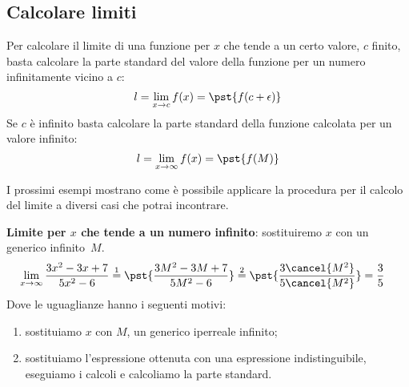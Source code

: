 \subsection{Calcolare limiti}
\label{subsec:cont_limiti_calcolo}

\begin{procedura}
Per calcolare il limite di una funzione per \(x\) che tende a un certo 
valore, \(c\) finito, basta calcolare la parte standard del valore della 
funzione per un numero infinitamente vicino a \(c\):
\[l=\lim_{x \rightarrow c} f(x) = \pst{f(c+\epsilon)}\]
Se \(c\) è infinito basta calcolare la parte standard della funzione 
calcolata per un valore infinito:
\[l=\lim_{x \rightarrow \infty} f(x) = \pst{f(M)}\]
\end{procedura}


I prossimi esempi mostrano come è possibile applicare la procedura per il 
calcolo del limite a diversi casi che potrai incontrare.

\begin{esempio}
\textbf{Limite per \(x\) che tende a un numero infinito}:
sostituiremo \(x\) con un generico infinito~\(M\).
\begin{align*}
\lim_{x \rightarrow \infty} \frac{3x^2-3x+7}{5x^2-6} & \stackrel{1}{=} 
  \pst{\frac{3M^2-3M+7}{5M^2-6}} \stackrel{2}{=}  
  \pst{\frac{3\cancel{M^2}}{5\cancel{M^2}}} = \frac{3}{5}
\end{align*}
Dove le uguaglianze hanno i seguenti motivi:
\begin{enumerate} [nosep]
 \item sostituiamo \(x\) con \(M\), un generico iperreale infinito;
 \item sostituiamo l'espressione ottenuta con una espressione 
   indistinguibile, eseguiamo i calcoli e calcoliamo la parte standard.
\end{enumerate}
\end{esempio}

